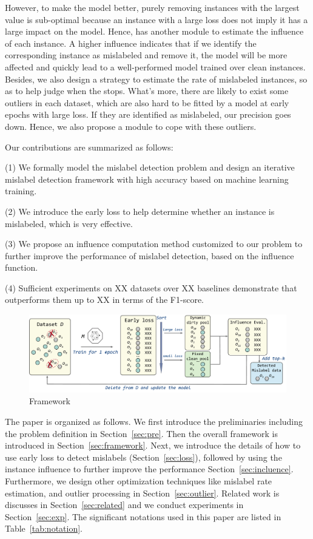 However, to make the model better, purely removing instances with the largest value is sub-optimal because an instance with a large loss does not imply it has a large impact on the model. Hence, \sys has another module  to estimate the influence of each instance. A higher influence indicates that if we identify the corresponding instance as mislabeled and remove it, the model will be more affected and quickly lead to a well-performed model trained over clean instances. Besides, we also design a strategy to estimate the rate of mislabeled instances, so as to help judge when the \sys stops. What's more, there are likely to  exist some outliers in each dataset, which are also hard to be  fitted by a model at early epochs with large loss. If they are identified as mislabeled, our precision goes down. Hence, we also propose a module to cope with these outliers.


Our contributions are summarized as follows:

\noindent (1) We formally model the mislabel detection problem and  design an iterative mislabel detection framework \sys with high accuracy based on machine learning training.

\noindent (2) We introduce the early loss to help determine whether an instance is mislabeled, which is very effective.

\noindent (3) We propose an influence computation method customized to our problem to further improve the performance of  mislabel detection, based on the influence function. 

\noindent (4) Sufficient experiments on XX datasets over XX baselines demonstrate that \sys outperforms them up to XX in terms of the F1-score.

\begin{figure}
	\centering
	\includegraphics[width=\textwidth]{figures/framework}
	\caption{\sys Framework}
	\label{fig:framework}
\end{figure}

The paper is organized as follows. We first introduce the preliminaries including the problem definition in Section~\ref{sec:pre}. Then the overall framework is introduced in  Section~\ref{sec:framework}. Next, we introduce the details of how to use early loss to detect mislabels (Section~\ref{sec:loss}), followed by using the instance influence to further improve the performance Section~\ref{sec:incluence}. Furthermore, we design other optimization techniques like mislabel rate estimation, and outlier processing in Section~\ref{sec:outlier}. Related work is discusses in Section~\ref{sec:related} and we conduct experiments in Section~\ref{sec:exp}. The significant notations used in this paper are listed in Table~\ref{tab:notation}.



